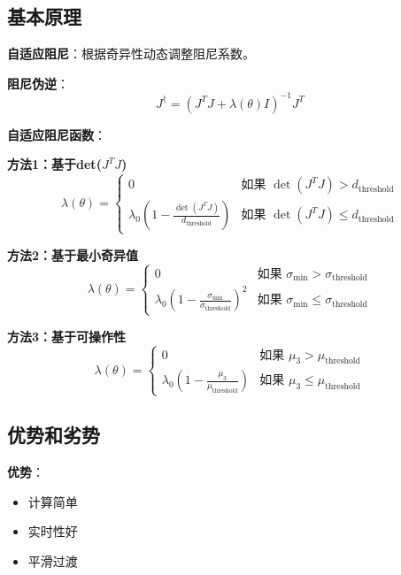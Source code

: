 \documentclass[12pt,a4paper]{article}
\begin{document}
\subsection{基本原理}

\textbf{自适应阻尼}：根据奇异性动态调整阻尼系数。

\textbf{阻尼伪逆}：
\begin{equation}
J^{\dagger} = (J^T J + \lambda(\theta) I)^{-1}J^T
\end{equation}

\textbf{自适应阻尼函数}：

\textbf{方法1：基于det($J^T J$)}
\begin{equation}
\lambda(\theta) = \begin{cases}
0 & \text{如果 } \det(J^T J) > d_{\text{threshold}} \\
\lambda_0\left(1 - \frac{\det(J^T J)}{d_{\text{threshold}}}\right) & \text{如果 } \det(J^T J) \leq d_{\text{threshold}}
\end{cases}
\end{equation}

\textbf{方法2：基于最小奇异值}
\begin{equation}
\lambda(\theta) = \begin{cases}
0 & \text{如果 } \sigma_{\min} > \sigma_{\text{threshold}} \\
\lambda_0\left(1 - \frac{\sigma_{\min}}{\sigma_{\text{threshold}}}\right)^2 & \text{如果 } \sigma_{\min} \leq \sigma_{\text{threshold}}
\end{cases}
\end{equation}

\textbf{方法3：基于可操作性}
\begin{equation}
\lambda(\theta) = \begin{cases}
0 & \text{如果 } \mu_3 > \mu_{\text{threshold}} \\
\lambda_0\left(1 - \frac{\mu_3}{\mu_{\text{threshold}}}\right) & \text{如果 } \mu_3 \leq \mu_{\text{threshold}}
\end{cases}
\end{equation}

\subsection{优势和劣势}

\textbf{优势}：
\begin{itemize}
\item 计算简单
\item 实时性好
\item 平滑过渡
\end{itemize}
\end{document}
